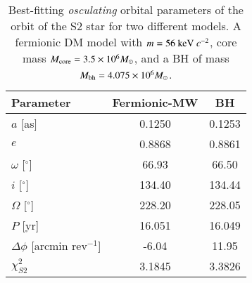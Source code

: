 \documentclass[twocolumn]{aa}
\begin{document}
\begin{table}[t]
\caption{Best-fitting \textit{osculating} orbital parameters of the orbit of the S2 star for two different models. A fermionic DM model with $m=56~{\rm keV}~c^{-2}$, core mass $M_{\rm{core}}=3.5\times 10^6 M_\odot$, and a BH of mass  $M_{\rm bh}=4.075\times 10^6 M_\odot$.}
\centering
\begin{tabular}{lcc}
\hline
Parameter & Fermionic-MW & BH \\
\hline 
$a$ [as] & 0.1250 & 0.1253 \\
$e$ & 0.8868 & 0.8861 \\
$\omega$ [$^{\circ}$] & 66.93 & 66.50 \\
$i$ [$^{\circ}$] & 134.40 & 134.44 \\
$\Omega$ [$^{\circ}$] & 228.20 & 228.05 \\
$P$ [yr] & 16.051 & 16.049 \\
$\Delta \phi$ [arcmin rev$^{-1}$] & -6.04 & 11.95 \\
\hline
$\chi^2_{S2}$ & 3.1845 & 3.3826 \\ \hline
\end{tabular}
\label{tab:S2}
\end{table}
%
\end{document}
